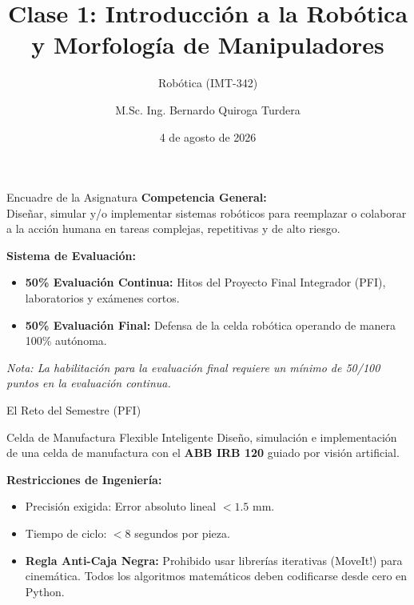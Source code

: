 \documentclass[aspectratio=169]{beamer}
\title[Introducción y Morfología]{Clase 1: Introducción a la Robótica y Morfología de Manipuladores}
\subtitle{Robótica (IMT-342)}
\author[B. Quiroga Turdera]{M.Sc. Ing. Bernardo Quiroga Turdera}
\institute[UCB Tarija]{Universidad Católica Boliviana ``San Pablo'' \\ Sede Tarija}
\date{4 de agosto de 2026}
\begin{document}
\begin{frame}
    \titlepage
\end{frame}

\begin{frame}{Encuadre de la Asignatura}
    \textbf{Competencia General:} \\
    Diseñar, simular y/o implementar sistemas robóticos para reemplazar o colaborar a la acción humana en tareas complejas, repetitivas y de alto riesgo. %
    
    \vspace{0.5cm}
    \textbf{Sistema de Evaluación:} %
    \begin{itemize}
        \item \textbf{50\% Evaluación Continua:} Hitos del Proyecto Final Integrador (PFI), laboratorios y exámenes cortos.
        \item \textbf{50\% Evaluación Final:} Defensa de la celda robótica operando de manera 100\% autónoma.
    \end{itemize}
    \vspace{0.3cm}
    \textit{Nota: La habilitación para la evaluación final requiere un mínimo de 50/100 puntos en la evaluación continua.} %
\end{frame}

\begin{frame}{El Reto del Semestre (PFI)}
    \begin{block}{Celda de Manufactura Flexible Inteligente}
        Diseño, simulación e implementación de una celda de manufactura con el \textbf{ABB IRB 120} guiado por visión artificial.
    \end{block}
    
    \textbf{Restricciones de Ingeniería:}
    \begin{itemize}
        \item Precisión exigida: Error absoluto lineal $< 1.5$ mm.
        \item Tiempo de ciclo: $< 8$ segundos por pieza.
        \item \textbf{Regla Anti-Caja Negra:} Prohibido usar librerías iterativas (MoveIt!) para cinemática. Todos los algoritmos matemáticos deben codificarse desde cero en Python.
    \end{itemize}
\end{frame}
\end{document}
